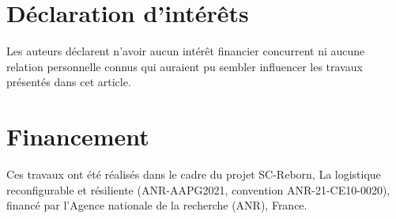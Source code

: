 \section*{Déclaration d'intérêts}

Les auteurs déclarent n'avoir aucun intérêt financier concurrent ni aucune relation personnelle connus qui auraient pu sembler influencer les travaux présentés dans cet article.

\ifanonyme\else
\section*{Financement}

Ces travaux ont été réalisés dans le cadre du projet SC-Reborn, \og La logistique reconfigurable et résiliente \fg{} (ANR-AAPG2021, convention ANR-21-CE10-0020), financé par l'Agence nationale de la recherche (ANR), France.
\fi
